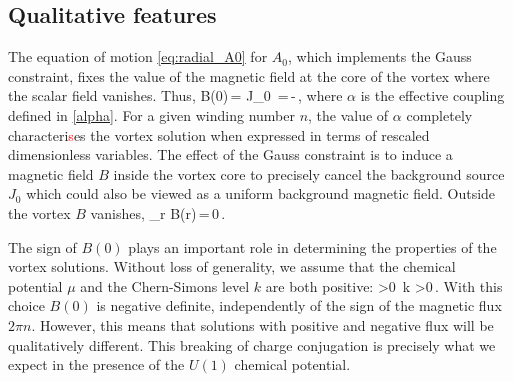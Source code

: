 \subsection{Qualitative features}
The equation of motion \eqref{eq:radial_A0} for $A_0$, which implements the Gauss constraint, fixes the value of the magnetic field at the core of the vortex where the scalar field vanishes. Thus,
\be
B(0)\,=\,\,J_0
\,=\,-\,,
\ee
where $\alpha$ is the effective coupling defined in \eqref{alpha}. For a given winding number $n$, the value of $\alpha$ completely characteri\textcolor{red}{s}es the vortex solution when expressed in terms of rescaled dimensionless variables.
The effect of the Gauss constraint is to induce a magnetic field $B$ inside the vortex core to precisely cancel the background source $J_0$ which could also  be viewed as a uniform background magnetic field.  Outside the vortex $B$ vanishes,
\be
\lim_{r\to\infty} B(r)\,=\,0\,.
\ee

The sign of $B(0)$ plays an important role in determining the properties of the vortex solutions. Without loss of generality, we assume that the chemical potential $\mu$ and the Chern-Simons level $k$ are both positive:
\be
\mu >0\, \qquad \qquad k >0\,.
\ee
With this choice $B(0)$ is negative definite,   independently of the sign of the magnetic flux $2\pi n$. However, this means that solutions with positive and negative flux will be qualitatively different. This breaking of charge conjugation is precisely what we expect in the presence of the $U(1)$ chemical potential.

